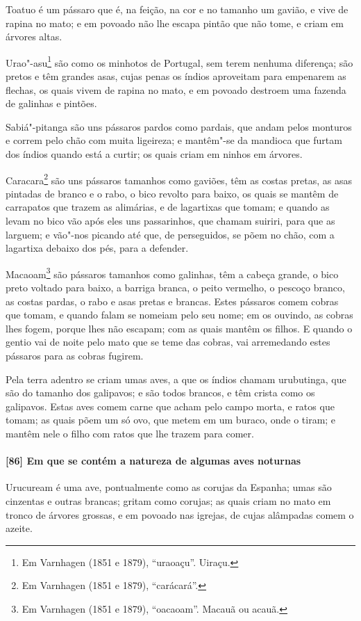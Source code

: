 Toatuo é um pássaro que é, na feição, na cor e no tamanho um gavião, e vive de rapina no
mato; e em povoado não lhe escapa pintão que não tome, e criam em árvores altas.

Urao"-asu\footnote{ Em Varnhagen (1851 e 1879), ``uraoaçu''. Uiraçu.} são como os minhotos
de Portugal, sem terem nenhuma diferença; são pretos e têm grandes asas, cujas penas os
índios aproveitam para empenarem as flechas, os quais vivem de rapina no mato, e em
povoado destroem uma fazenda de galinhas e pintões.

Sabiá"-pitanga são uns pássaros pardos como pardais, que andam pelos monturos e correm pelo
chão com muita ligeireza; e mantêm"-se da mandioca que furtam dos índios quando está a
curtir; os quais criam em ninhos em árvores.

Caracara\footnote{ Em Varnhagen (1851 e 1879), ``carácará''.} são uns pássaros tamanhos
como gaviões, têm as costas pretas, as asas pintadas de branco e o rabo, o bico revolto
para baixo, os quais se mantêm de carrapatos que trazem as alimárias, e de lagartixas que
tomam; e quando as levam no bico vão após eles uns passarinhos, que chamam suiriri, para
que as larguem; e vão"-nos picando até que, de perseguidos, se põem no chão, com a
lagartixa debaixo dos pés, para a defender.

Macaoam\footnote{ Em Varnhagen (1851 e 1879), ``oacaoam''. Macauã ou acauã.} são pássaros
tamanhos como galinhas, têm a cabeça grande, o bico preto voltado para baixo, a barriga
branca, o peito vermelho, o pescoço branco, as costas pardas, o rabo e asas pretas e
brancas. Estes pássaros comem cobras que tomam, e quando falam se nomeiam pelo seu nome;
em os ouvindo, as cobras lhes fogem, porque lhes não escapam; com as quais mantêm os
filhos. E quando o gentio vai de noite pelo mato que se teme das cobras, vai arremedando
estes pássaros para as cobras fugirem.

Pela terra adentro se criam umas aves, a que os índios chamam urubutinga, que são do
tamanho dos galipavos; e são todos brancos, e têm crista como os galipavos. Estas aves
comem carne que acham pelo campo morta, e ratos que tomam; as quais põem um só ovo, que
metem em um buraco, onde o tiram; e mantêm nele o filho com ratos que lhe trazem para
comer.

\paragraph{[86] Em que se contém a natureza de algumas aves noturnas}\quad
Urucuream é uma ave, pontualmente como as corujas da Espanha; umas são cinzentas e outras
brancas; gritam como corujas; as quais criam no mato em tronco de árvores grossas, e em
povoado nas igrejas, de cujas alâmpadas comem o azeite.

